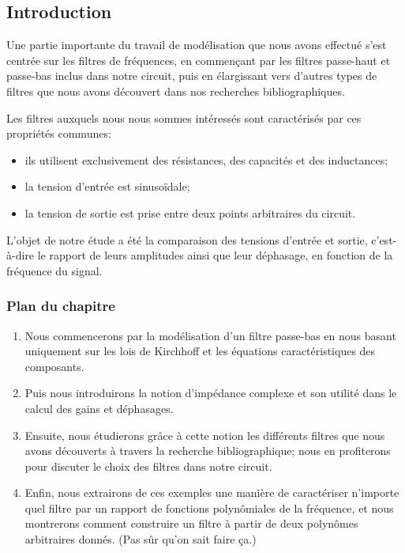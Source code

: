 \subsection*{Introduction}

Une partie importante du travail de modélisation que nous avons effectué
s'est centrée sur les filtres de fréquences,
en commençant par les filtres passe-haut et passe-bas inclus dans notre circuit,
puis en élargissant vers d'autres types de filtres que nous avons découvert
dans nos recherches bibliographiques.

Les filtres auxquels nous nous sommes intéressés sont caractérisés
par ces propriétés communes:
\begin{itemize}
    \item ils utilisent exclusivement des résistances,
        des capacités et des inductances;
    \item la tension d'entrée est sinusoïdale;
    \item la tension de sortie est prise entre deux points arbitraires
        du circuit.
\end{itemize}

L'objet de notre étude a été la comparaison des tensions d'entrée et sortie,
c'est-à-dire le rapport de leurs amplitudes ainsi que leur déphasage,
en fonction de la fréquence du signal.


\subsubsection*{Plan du chapitre}
\begin{enumerate}
    \item Nous commencerons par la modélisation
        d'un filtre passe-bas en nous basant uniquement sur les lois
        de Kirchhoff et les équations caractéristiques des composants.
    \item Puis nous introduirons la notion d'impédance complexe et son utilité
        dans le calcul des gains et déphasages.
    \item Ensuite, nous étudierons grâce à cette notion
        les différents filtres que nous avons découverts à travers
        la recherche bibliographique;
        nous en profiterons pour discuter
        le choix des filtres dans notre circuit.
    \item Enfin, nous extrairons de ces exemples une manière de caractériser
        n'importe quel filtre par un rapport de fonctions
        polynômiales de la fréquence, et nous montrerons comment construire
        un filtre à partir de deux polynômes arbitraires donnés.
        (Pas sûr qu'on sait faire ça.)
\end{enumerate}
